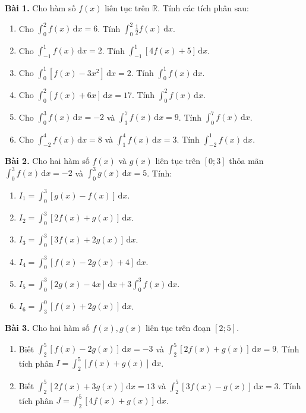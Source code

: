 \documentclass[12pt]{article}
\begin{document}
	\begin{btdo}
		\textbf{Bài 1.} Cho hàm số $f(x)$ liên tục trên $\mathbb{R}$. Tính các tích phân sau:
		\begin{enumerate}[label=\alph*)]
			\item Cho $\displaystyle \int_0^2 f(x)\,\mathrm{d}x = 6$. Tính $\displaystyle \int_0^2 \frac{1}{2} f(x)\,\mathrm{d}x$.
			\item Cho $\displaystyle \int_{-1}^1 f(x)\,\mathrm{d}x = 2$. Tính $\displaystyle \int_{-1}^1 [4f(x) + 5]\,\mathrm{d}x$.
			\item Cho $\displaystyle \int_0^1 [f(x) - 3x^2]\,\mathrm{d}x = 2$. Tính $\displaystyle \int_0^1 f(x)\,\mathrm{d}x$.
			\item Cho $\displaystyle \int_0^2 [f(x) + 6x]\,\mathrm{d}x = 17$. Tính $\displaystyle \int_0^2 f(x)\,\mathrm{d}x$.
			\item Cho $\displaystyle \int_0^3 f(x)\,\mathrm{d}x = -2$ và $\displaystyle \int_3^7 f(x)\,\mathrm{d}x = 9$. Tính $\displaystyle \int_0^7 f(x)\,\mathrm{d}x$.
			\item Cho $\displaystyle \int_{-2}^4 f(x)\,\mathrm{d}x = 8$ và $\displaystyle \int_1^4 f(x)\,\mathrm{d}x = 3$. Tính $\displaystyle \int_{-2}^1 f(x)\,\mathrm{d}x$.
		\end{enumerate}
		
		\textbf{Bài 2.} Cho hai hàm số $f(x)$ và $g(x)$ liên tục trên $[0; 3]$ thỏa mãn $\displaystyle \int_0^3 f(x)\,\mathrm{d}x = -2$ và $\displaystyle \int_0^3 g(x)\,\mathrm{d}x = 5$. Tính:
		\begin{enumerate}[label=\alph*)]
			\item $I_1 = \displaystyle \int_0^3 [g(x) - f(x)]\,\mathrm{d}x$.
			\item $I_2 = \displaystyle \int_0^3 [2f(x) + g(x)]\,\mathrm{d}x$.
			\item $I_3 = \displaystyle \int_0^3 [3f(x) + 2g(x)]\,\mathrm{d}x$.
			\item $I_4 = \displaystyle \int_0^3 [f(x) - 2g(x) + 4]\,\mathrm{d}x$.
			\item $I_5 = \displaystyle \int_0^3 [2g(x) - 4x]\,\mathrm{d}x + 3\int_0^3 f(x)\,\mathrm{d}x$.
			\item $I_6 = \displaystyle \int_3^0 [f(x) + 2g(x)]\,\mathrm{d}x$.
		\end{enumerate}
		
		\textbf{Bài 3.} Cho hai hàm số $f(x), g(x)$ liên tục trên đoạn $[2; 5]$.
		\begin{enumerate}[label=\alph*)]
			\item Biết $\displaystyle \int_2^5 [f(x) - 2g(x)]\,\mathrm{d}x = -3$ và $\displaystyle \int_2^5 [2f(x) + g(x)]\,\mathrm{d}x = 9$. Tính tích phân $I = \displaystyle \int_2^5 [f(x) + g(x)]\,\mathrm{d}x$.
			\item Biết $\displaystyle \int_2^5 [2f(x) + 3g(x)]\,\mathrm{d}x = 13$ và $\displaystyle \int_2^5 [3f(x) - g(x)]\,\mathrm{d}x = 3$. Tính tích phân $J = \displaystyle \int_2^5 [4f(x) + g(x)]\,\mathrm{d}x$.
		\end{enumerate}
	\end{btdo}
	
\end{document}
